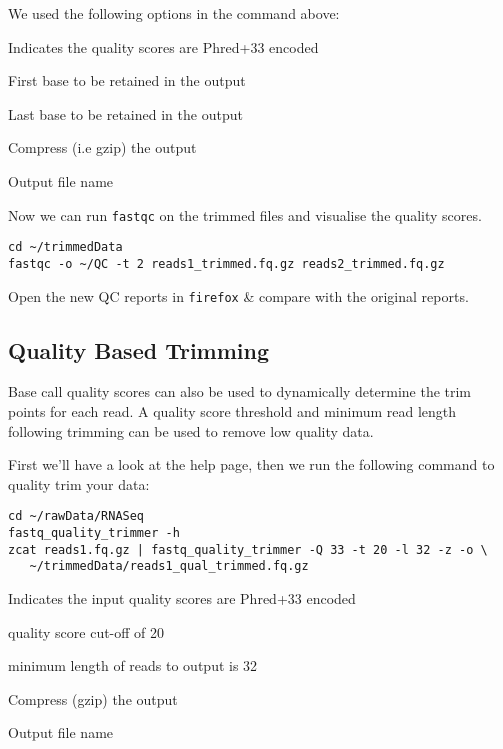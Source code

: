 \begin{note}
We used the following options in the command above:
\begin{description}[style=multiline,labelindent=0cm,align=right,leftmargin=0.8\descriptionlabelspace,rightmargin=1.5cm,font=\ttfamily]
\item[-Q 33] Indicates the quality scores are Phred+33 encoded
\item[-f 1] First base to be retained in the output
\item[-l 32] Last base to be retained in the output
\item[-z] Compress (i.e gzip) the output
\item[-o] Output file name
\end{description}
\end{note}

\begin{steps}
Now we can run \texttt{fastqc} on the trimmed files and visualise the quality scores.
\begin{lstlisting}
cd ~/trimmedData
fastqc -o ~/QC -t 2 reads1_trimmed.fq.gz reads2_trimmed.fq.gz
\end{lstlisting}
Open the new QC reports in \texttt{firefox} \& compare with the original reports.
\end{steps}


\subsection{Quality Based Trimming}
Base call quality scores can also be used to dynamically determine the trim points for each read. 
A quality score threshold and minimum read length following trimming can be used to remove low quality data. \\
\begin{steps}
First we'll have a look at the help page, then we  run the following command to quality trim your data:
\begin{lstlisting}
cd ~/rawData/RNASeq
fastq_quality_trimmer -h
zcat reads1.fq.gz | fastq_quality_trimmer -Q 33 -t 20 -l 32 -z -o \
   ~/trimmedData/reads1_qual_trimmed.fq.gz
\end{lstlisting}
\end{steps}

\begin{note}
\begin{description}[style=multiline,labelindent=0cm,align=right,leftmargin=0.8\descriptionlabelspace,rightmargin=1.5cm,font=\ttfamily]
\item[-Q 33] Indicates the input quality scores are Phred+33 encoded
\item[-t 20] quality score cut-off of 20
\item[-l 32] minimum length of reads to output is 32
\item[-z] Compress (gzip) the output
\item[-o] Output file name
\end{description}
\end{note}

